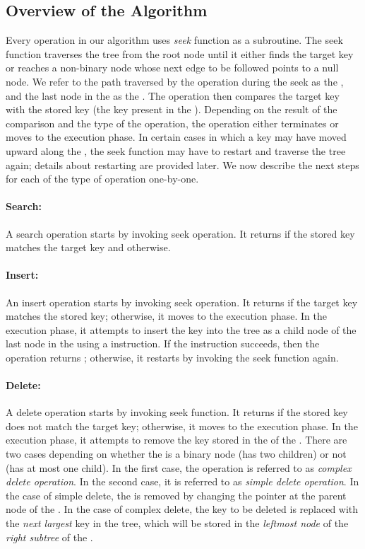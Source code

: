 \subsection{Overview of the Algorithm}
Every operation in our algorithm uses \emph{seek} function as a subroutine. The seek function traverses the  tree from the root node until it either finds the target key or reaches a non-binary node whose next edge to be followed points to a null node. We refer to the path traversed by the operation during the seek  as the \emph{\accesspath}, and the last node in the \accesspath{} as the \emph{\terminalnode}. The operation then compares the target key with the stored key (the key present in the \terminalnode). Depending on the result of the comparison and the type of the operation, the operation either terminates or moves to the execution phase. In certain cases in which a key may have moved upward along the \accesspath, the seek function may have to restart and traverse the tree again; details about restarting are provided later. We now describe the next steps for each of the type of operation one-by-one. 

\paragraph{Search:} 
A search operation starts by invoking seek operation. It returns \true{} if the stored key matches the target key and \false{} otherwise. 

\paragraph{Insert:}
An insert operation starts by invoking seek operation. It returns \false{} if the target key matches the stored key; otherwise, it moves to the execution phase. In the execution phase, it attempts to insert the key into the tree as a child node of the last node in the \accesspath{} using a \CAS{} instruction. If the instruction succeeds, then the operation returns \true{}; otherwise, it restarts by invoking the seek function again.

\paragraph{Delete:} 
A delete operation starts by invoking seek function. It returns \false{} if the stored key does not match the target key; otherwise, it moves to the execution phase. In the execution phase, it attempts to remove the key stored in the \terminalnode{} of the \accesspath. There are two cases depending on whether the \terminalnode{} is a binary node (has two children) or not (has at most one child). In the first case, the operation is referred to as \emph{complex delete operation}. In the second case, it is referred to as \emph{simple delete operation}. In the case of simple delete, the \terminalnode{} is removed by changing the pointer at the parent node of the \terminalnode. In the 
case of complex delete, the key to be deleted is replaced with the \emph{next largest} key in the tree, which will be stored in the \emph{leftmost node} of the \emph{right subtree} of the \terminalnode.